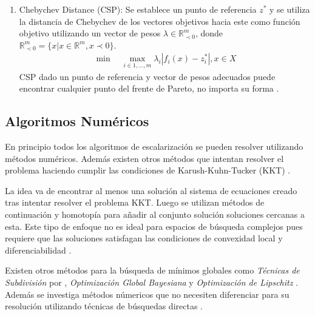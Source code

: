 \begin{enumerate}
\item Chebychev Distance (CSP): Se establece un punto de referencia $z^*$ y se utiliza la distancia de Chebychev de los vectores objetivos hacia este como funci\'on objetivo utilizando un vector de pesos $\lambda \in \mathbb{R}^m_{\prec 0}$, donde $\mathbb{R}^m_{\prec 0} = \{x | x \in \mathbb{R}^m, x \prec 0 \}$. 
    \begin{align*}
        \min \quad \max_{i \in {1,...,m}} \lambda_i |f_i(x) - z^*_i|, x \in X 
    \end{align*}
    CSP dado un punto de referencia y vector de pesos adecuados puede encontrar cualquier punto del frente de Pareto, no importa su forma .
\end{enumerate}



\subsection{Algoritmos Num\'ericos}

En principio todos los algoritmos de escalarizaci\'on se pueden resolver utilizando m\'etodos num\'ericos. Adem\'as existen otros m\'etodos  que intentan resolver el problema haciendo cumplir las condiciones de Karush-Kuhn-Tucker (KKT) .

La idea va de encontrar al menos una soluci\'on al sistema de ecuaciones creado tras intentar resolver el problema KKT. Luego se utilizan m\'etodos de continuaci\'on y homotop\'ia para añadir al conjunto soluci\'on soluciones cercanas a esta. 
Este tipo de enfoque no es ideal para espacios de b\'usqueda complejos pues requiere que las soluciones satisfagan las condiciones de convexidad local y diferenciabilidad  .

Existen otros m\'etodos para la b\'usqueda de m\'inimos globales como \textit{T\'ecnicas de Subdivisi\'on} por , \textit{Optimizaci\'on Global Bayesiana}  y \textit{Optimizaci\'on de Lipschitz} . %
Adem\'as  se investiga  m\'etodos n\'umericos que no necesiten diferenciar para su resoluci\'on utilizando t\'ecnicas de b\'usquedas directas .

